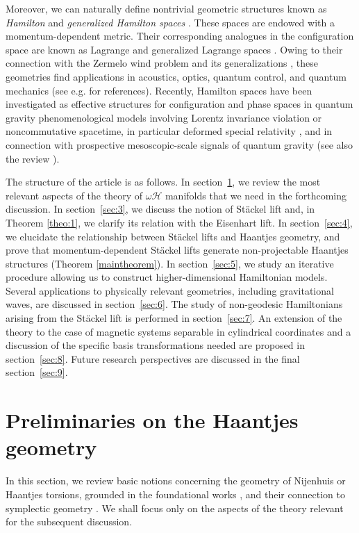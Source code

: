 \documentclass[10pt]{amsart}
\numberwithin{equation}{section}
\theoremstyle{definition}
\begin{document}
	Moreover, we can naturally define nontrivial geometric structures known as \textit{Hamilton} and \textit{generalized Hamilton spaces} \cite{Miron2001,RSS2024}. These spaces are endowed with a momentum-dependent metric. Their corresponding analogues in the configuration space are known as Lagrange and generalized Lagrange spaces \cite{Voicu2021}. Owing to their connection with the Zermelo wind problem \cite{Zermelo} and its generalizations \cite{Aldea}, these geometries find applications in acoustics, optics, quantum control, and quantum mechanics (see e.g. \cite{Li} for references). Recently, Hamilton spaces have been investigated as effective structures for configuration and phase spaces in quantum gravity phenomenological models involving Lorentz invariance violation or noncommutative spacetime, in particular deformed special relativity \cite{BBGLP2015PRD}, and in connection with prospective mesoscopic-scale signals of quantum gravity \cite{CLR2022PRD} (see also the review \cite{Albuquerque}).
	

	The structure of the article is as follows. In section~\ref{sec:2}, we review the most relevant aspects of the theory of $\omega\mathscr{H}$ manifolds that we need in the forthcoming discussion. In section~\ref{sec:3}, we discuss the notion of St\"ackel lift and, in Theorem \ref{theo:1}, we clarify its relation with the Eisenhart lift. In section~\ref{sec:4}, we elucidate the relationship between St\"ackel lifts and Haantjes geometry, and prove that momentum-dependent Stäckel lifts generate non-projectable Haantjes structures (Theorem \ref{maintheorem}). In section~\ref{sec:5}, we study an iterative procedure allowing us to construct higher-dimensional Hamiltonian models.  Several applications to physically relevant geometries, including gravitational waves, are discussed in section~\ref{sec:6}.  The study of non-geodesic Hamiltonians arising from the St\"ackel lift is performed in section~\ref{sec:7}. An extension of the theory to the case of magnetic systems separable in cylindrical coordinates and a discussion of the specific basis transformations needed are proposed in section~\ref{sec:8}. Future research perspectives are discussed in the final section~\ref{sec:9}.
	

	
	\section{Preliminaries on the Haantjes geometry}
	\label{sec:2}

	 In this section, we review basic notions concerning the geometry of Nijenhuis or Haantjes torsions, grounded in the foundational works \cite{Haa1955,Nij1951,Nij1955,Nij19552,FN1956}, and their connection to symplectic geometry \cite{TT2021JGP,TT2022AMPA,RTT2022CNS,RTT2024AMPA}. We shall focus only on the aspects of the theory relevant for the subsequent discussion.
	
\end{document}
